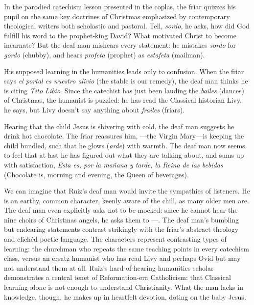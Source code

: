 In the parodied catechism lesson presented in the coplas, the friar quizzes his
pupil on the same key doctrines of Christmas emphasized by contemporary
theological writers both scholastic and pastoral.%
    \Autocite[]{Cashner:PhD} %
Tell, \emph{sordo}, he asks, how did God fulfill his word to the prophet-king
David?  What motivated Christ to become incarnate? But the deaf man mishears
every statement: he mistakes \emph{sordo} for \emph{gordo} (chubby), and hears
\emph{profeta} (prophet) as \emph{estafeta} (mailman).

His supposed learning in the humanities leads only to confusion.
When the friar says \emph{el portal es nuestro alivio} (the stable is our
remedy), the deaf man thinks he is citing \emph{Tito Libio}.
Since the catechist has just been lauding the \emph{bailes} (dances) of
Christmas, the humanist is puzzled: he has read the Classical historian Livy, he
says, but Livy doesn't say anything about \emph{frailes} (friars).

Hearing that the child Jesus is shivering with cold, the deaf man suggests he
drink hot chocolate.
The friar reassures him, ---the Virgin Mary---is keeping the
child bundled, such that he glows (\emph{arde}) with warmth.
The deaf man now seems to feel that at last he has figured out what they are
talking about, and sums up with satisfaction, \emph{Esta es, por la mañana y
tarde, la Reina de las bebidas} (Chocolate is, morning and evening, the Queen of
beverages).

We can imagine that Ruiz's deaf man would invite the sympathies of listeners.
He is an earthy, common character, keenly aware of the chill, as many older men
are.
The deaf man even explicitly asks not to be mocked: since he cannot hear the
nine choirs of Christmas angels, he asks them to ---.
The deaf man's bumbling but endearing statements contrast strikingly with the
friar's abstract theology and clichéd poetic language.
The characters represent contrasting types of learning: the churchman who
repeats the same teaching points in every catechism class, versus an ersatz
humanist who has read Livy and perhaps Ovid but may not understand them at all.
Ruiz's hard-of-hearing humanities scholar demonstrates a central tenet of
Reformation-era Catholicism: that Classical learning alone is not enough to
understand Christianity.%
    \Autocite
    [206: .] 
    {Erasmus:Dolan}
What the man lacks in knowledge, though, he makes up in heartfelt devotion,
doting on the baby Jesus.

